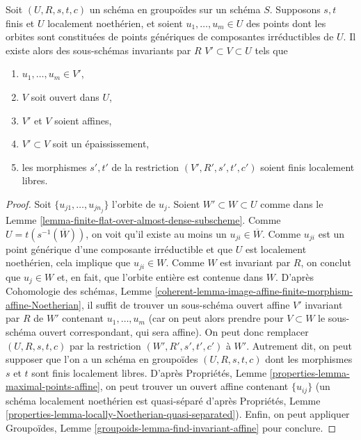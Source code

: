 \begin{lemma}
\label{lemma-invariant-affine-open-around-generic-point-Noetherian}
Soit $(U, R, s, t, c)$ un schéma en groupoïdes sur un schéma $S$.
Supposons $s, t$ finis et $U$ localement noethérien, et soient $u_1, \ldots, u_m \in U$
des points dont les orbites sont constituées de points génériques de
composantes irréductibles de $U$. Il existe alors des sous-schémas invariants par $R$
$V' \subset V \subset U$ tels que
\begin{enumerate}
\item $u_1, \ldots, u_m \in V'$,
\item $V$ soit ouvert dans $U$,
\item $V'$ et $V$ soient affines,
\item $V' \subset V$ soit un épaississement,
\item les morphismes $s', t'$ de la restriction $(V', R', s', t', c')$
soient finis localement libres.
\end{enumerate}
\end{lemma}

\begin{proof}
Soit $\{u_{j1}, \ldots, u_{jn_j}\}$ l'orbite de $u_j$.
Soient $W' \subset W \subset U$ comme dans le
Lemme \ref{lemma-finite-flat-over-almost-dense-subscheme}.
Comme $U = t(s^{-1}(\overline{W}))$, on voit qu'il existe au moins
un $u_{ji} \in \overline{W}$. Comme $u_{ji}$ est un point générique
d'une composante irréductible et que $U$ est localement noethérien,
cela implique que $u_{ji} \in W$. Comme $W$ est invariant par $R$, on
conclut que $u_j \in W$ et, en fait, que l'orbite entière est contenue dans $W$.
D'après Cohomologie des schémas, Lemme
\ref{coherent-lemma-image-affine-finite-morphism-affine-Noetherian},
il suffit de trouver un sous-schéma ouvert affine $V'$ invariant par $R$
de $W'$ contenant $u_1, \ldots, u_m$ (car on peut alors prendre pour $V \subset W$
le sous-schéma ouvert correspondant, qui sera affine).
On peut donc remplacer $(U, R, s, t, c)$
par la restriction $(W', R', s', t', c')$ à $W'$.
Autrement dit, on peut supposer que l'on a un schéma en groupoïdes $(U, R, s, t, c)$
dont les morphismes $s$ et $t$ sont finis localement libres.
D'après Propriétés, Lemme \ref{properties-lemma-maximal-points-affine},
on peut trouver un ouvert affine contenant $\{u_{ij}\}$
(un schéma localement noethérien est quasi-séparé d'après
Propriétés, Lemme \ref{properties-lemma-locally-Noetherian-quasi-separated}).
Enfin, on peut appliquer
Groupoïdes, Lemme \ref{groupoids-lemma-find-invariant-affine}
pour conclure.
\end{proof}

